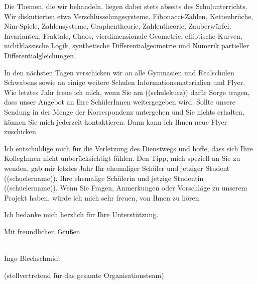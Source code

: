 \documentclass{../zirkelbrief}
\begin{document}
Die Themen, die wir behandeln, liegen dabei stets abseits des
Schulunterrichts. Wir diskutierten etwa Verschlüsselungssysteme,
Fibonacci-Zahlen, Kettenbrüche, Nim-Spiele, Zahlensysteme, Graphentheorie,
Zahlentheorie, Zauberwürfel, Invarianten, Fraktale, Chaos,
vierdimensionale Geometrie, elliptische Kurven, nichtklassische Logik,
synthetische Differentialgeometrie und Numerik partieller
Differentialgleichungen.

In den nächsten Tagen verschicken wir an alle Gymnasien und Realschulen Schwabens sowie
an einige weitere Schulen Informationsmaterialien und Flyer. Wie letztes Jahr
freue ich mich, wenn Sie am ((schulekurz)) dafür Sorge tragen, dass unser Angebot
an Ihre SchülerInnen weitergegeben wird. Sollte unsere Sendung in der Menge der
Korrespondenz untergehen und Sie nichts erhalten, können Sie mich jederzeit
kontaktieren. Dann kann ich Ihnen neue Flyer zuschicken.

Ich entschuldige mich für die Verletzung des Dienstwegs und hoffe, dass sich
Ihre KollegInnen nicht unberücksichtigt fühlen. Den Tipp, mich speziell an Sie
zu wenden, gab mir letztes Jahr
\ifschuelermaennlich
Ihr ehemaliger Schüler und jetziger Student ((schuelername)).
\else
Ihre ehemalige Schülerin und jetzige Studentin ((schuelername)).
\fi
Wenn Sie Fragen, Anmerkungen oder Vorschläge zu unserem Projekt haben, würde ich mich
sehr freuen, von Ihnen zu hören.

Ich bedanke mich herzlich für Ihre Unterstützung.
\enlargethispage{1em}

Mit freundlichen Grüßen

\ \\

Ingo Blechschmidt

\vspace{-0.2cm}

{\small (stellvertretend für das gesamte Organisationsteam)}
\end{document}
